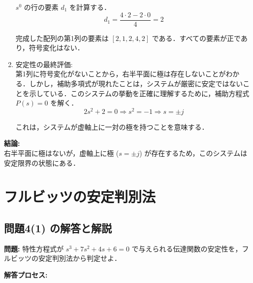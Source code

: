 \documentclass[11pt,a4paper]{ltjsarticle}
\begin{document}
\begin{enumerate}
$s^0$ の行の要素 $d_1$ を計算する．
$$d_1 = \frac{4 \cdot 2 - 2 \cdot 0}{4} = 2$$

完成した配列の第1列の要素は $[2, 1, 2, 4, 2]$ である．すべての要素が正であり，符号変化はない．

\item 安定性の最終評価:\\
第1列に符号変化がないことから，右半平面に極は存在しないことがわかる．しかし，補助多項式が現れたことは，システムが厳密に安定ではないことを示している．このシステムの挙動を正確に理解するために，補助方程式 $P(s)=0$ を解く．
$$2s^2+2=0 \Rightarrow s^2=-1 \Rightarrow s=\pm j$$

これは，システムが虚軸上に一対の極を持つことを意味する．
\end{enumerate}

\textbf{結論:}\\
右半平面に極はないが，虚軸上に極 ($s=\pm j$) が存在するため，このシステムは安定限界の状態にある．

\section{フルビッツの安定判別法}

\subsection{問題4(1) の解答と解説}

\textbf{問題:} 特性方程式が $s^3+7s^2+4s+6=0$ で与えられる伝達関数の安定性を，フルビッツの安定判別法から判定せよ．

\textbf{解答プロセス:}
\end{document}
